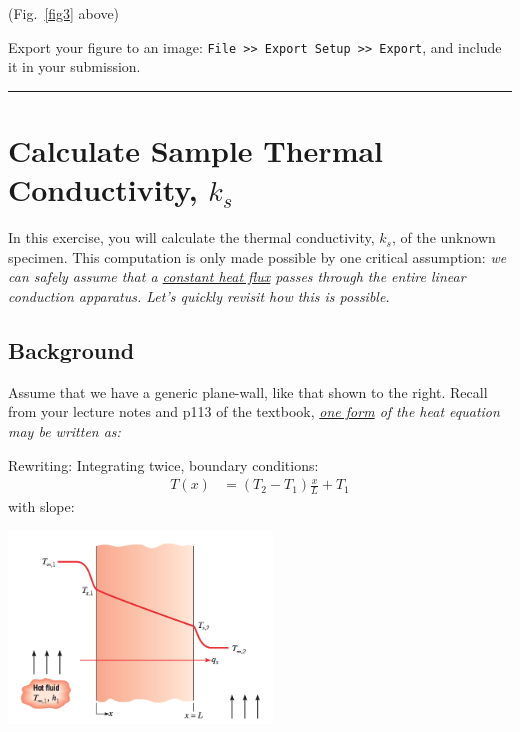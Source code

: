 \documentclass[11pt, letterpaper]{article}
\begin{document}
\begin{formal}
    \begin{deliv}  (Fig.~\ref{fig3} above) 
    
   Export your figure to an image: \texttt{File >> Export Setup >> Export}, and include it in your submission.
    \end{deliv}
\end{formal}

\n
\hrule
\section{Calculate Sample Thermal Conductivity, $k_s$}

In this exercise, you will calculate the thermal conductivity, $k_s$, of the unknown specimen. This computation is only made possible by one critical assumption: \it{we can safely assume that a \ul{constant heat flux} passes through the entire linear conduction apparatus.} Let's quickly revisit how this is possible.

\subsection{Background}
Assume that we have a generic plane-wall, like that shown to the right. Recall from your lecture notes and p113 of the textbook, \it{\ul{one form} of the heat equation} may be written as:
\begin{minipage}[c]{0.50\textwidth}
{\small
Rewriting:
Integrating twice, boundary conditions:
\begin{align}
    T(x) &= (T_2 - T_1) \frac{x}{L} + T_1
\end{align}
with slope:
}
\end{minipage}  \hfill
\begin{minipage}[c]{0.50\linewidth}
\hspace{0mm}
\vspace{-2ex}
    \includegraphics[width=70mm]{gfx/fig4.png}
\vspace{2pt}
\end{minipage}
\end{document}
